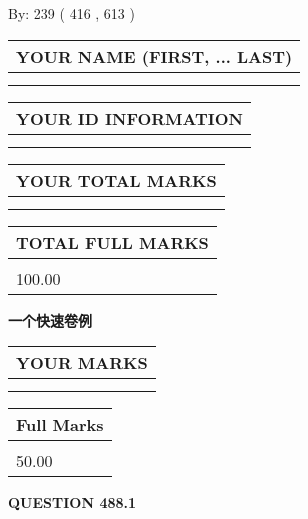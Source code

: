 \documentclass{ctexart}
\begin{document}
   
\hspace{1.0in} By: 
 239 ( 416 ,  613 )
   
   
   
   
\newpage 
\setcounter{page}{ 
   488001 } 
   
   
   
   
\noindent\begin{tabular}{|l|}
\hline
YOUR NAME (FIRST, ... LAST)  \\
\hline
 \\ 
 \\ 
\hline
\end{tabular}
\hspace{0.05in} \begin{tabular}{|l|}
\hline
 YOUR   ID   INFORMATION  \\
\hline
 \\ 
 \\ 
\hline
\end{tabular}
   
   
\vspace{0.2in}\noindent\begin{tabular}{|l|}
\hline
YOUR TOTAL MARKS  \\
\hline
 \\ 
 \\ 
\hline
\end{tabular}
\hspace{0.05in} \begin{tabular}{|l|}
\hline
TOTAL FULL MARKS  \\
\hline
 \\ 
100.00 \\
\hline
\end{tabular}
   
   
 \vspace{0.2in}
{\LARGE {\textbf{ 一个快速卷例}}}
   
   
  
\vspace{0.2in}
  
\noindent\begin{tabular}{|l|}
\hline
 YOUR MARKS  \\
\hline
 \\ 
 \\ 
\hline
\end{tabular}
\hspace{0.05in} \begin{tabular}{|l|}
\hline
 Full Marks  \\
\hline
 \\ 
50.00 \\
\hline
\end{tabular}
{\textbf{\Large{QUESTION
488.1 
}}}
  
\end{document}
